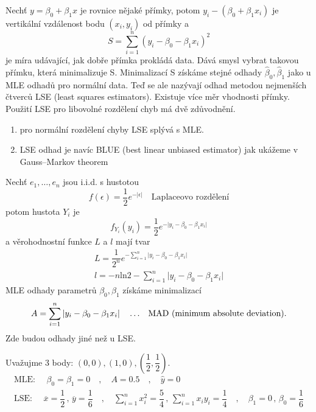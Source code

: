 Nechť $ y = \beta_{0} + \beta_{1} x  $ je rovnice nějaké přímky, potom $ y_{i} - (\beta_{0} + \beta_{1} x_{i}) $ je vertikální vzdálenost bodu $ (x_{i},y_{i}) $ od přímky a 
\begin{equation}
 S = \sum_{i=1}^{n} (y_{i} - \beta_{0} - \beta_{1} x_{i})^{2}
\end{equation}
je míra udávající, jak dobře přímka prokládá data. Dává smysl vybrat takovou přímku, která minimalizuje S. Minimalizací S získáme stejné odhady $  \widehat{\beta}_{0}, \widehat{\beta}_{1} $ jako u MLE odhadů pro normální data. Teď se ale nazývají odhad metodou nejmenších čtverců LSE (least squares estimators).
Existuje více měr vhodnosti přímky. Použití LSE pro libovolné rozdělení chyb má dvě zdůvodnění.
\begin{enumerate}
  \item pro normální rozdělení chyby LSE splývá s MLE.
  \item LSE odhad je navíc BLUE (best linear unbiased estimator) jak ukážeme v Gauss–Markov theorem
\end{enumerate}

\begin{example}
Nechť $ e_{1}, \dots , e_{n} $ jsou i.i.d. s hustotou
\begin{equation*}
  f(\epsilon) = \dfrac{1}{2} e ^{- \vert \epsilon \vert} \quad \text{Laplaceovo rozdělení}
\end{equation*}
potom hustota $ Y_{i} $ je 
\begin{equation*}
  f_{Y_{i}}(y_{i}) = \dfrac{1}{2} e ^{- \vert y_{i} - \beta_{0} - \beta_{1} x_{i} \vert} 
\end{equation*}
a věrohodnostní funkce $ L $ a $  l$ mají tvar
\begin{equation*}
\begin{aligned}
  L = \dfrac{1}{2^{n}} e ^{- \sum_{i=1}^{n} \vert y_{i} - \beta_{0} - \beta_{1} x_{i} \vert}  \\
  l = -n \text{ln} 2 - \sum_{i=1}^{n} \vert y_{i} - \beta_{0} - \beta_{1} x_{i} \vert 
\end{aligned} 
\end{equation*}
MLE odhady parametrů $ \beta_{0} , \beta_{1} $ získáme minimalizací
\begin{equation}
A = \sum_{i=1}^{n} \vert y_{i} - \beta_{0} - \beta_{1} x_{i} \vert \quad \dots \text{ \, MAD (minimum absolute deviation).}
\end{equation}
Zde budou odhady jiné než u LSE.

Uvažujme 3 body: $ (0,0) , (1,0) , (\dfrac{1}{2},\dfrac{1}{2}) $.
\begin{equation}
\begin{aligned}
\text{MLE: } \quad  \beta_{0} = \beta_{1} = 0 \quad , \quad A = 0.5
 \quad , \quad \widehat{y} = 0 \\
 \text{LSE: } \quad \overline{x} = \dfrac{1}{2} \, , \, \overline{y} = \dfrac{1}{6} \quad , \quad \sum_{i=1}^{n} x_{i}^{2} = \dfrac{5}{4} \, , \, \sum_{i=1}^{n} x_{i} y_{i} = \dfrac{1}{4} \quad , \quad \beta_{1} = 0 \, , \, \beta_{0} = \dfrac{1}{6}
  \end{aligned}  
\end{equation}
\end{example}

